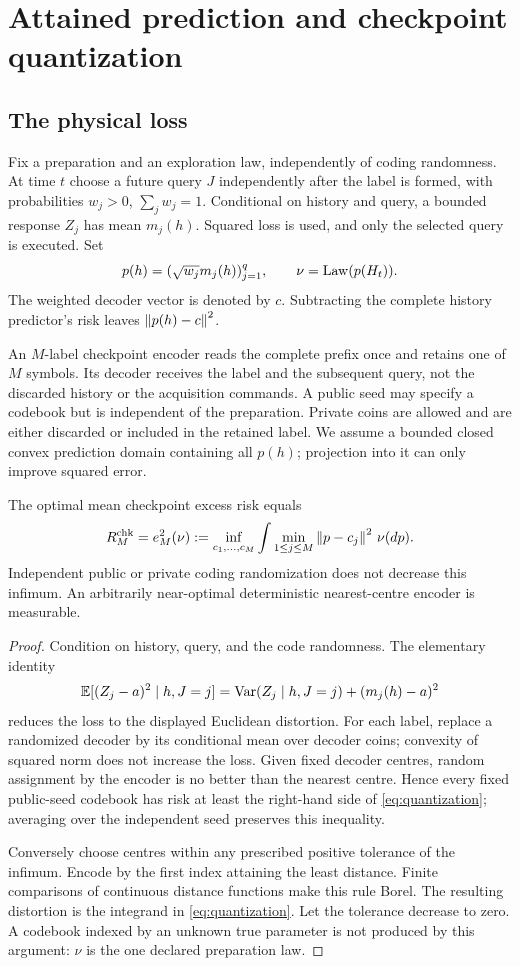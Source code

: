 \section{Attained prediction and checkpoint quantization}\label{sec:checkpoint}
\subsection{The physical loss}
Fix a preparation and an exploration law, independently of coding
randomness. At time $t$ choose a future query $J$ independently after the
label is formed, with probabilities $w_j>0$, $\sum_jw_j=1$. Conditional on
history and query, a bounded response $Z_j$ has mean $m_j(h)$. Squared loss
is used, and only the selected query is executed. Set
\[
 p(h)=(\sqrt{w_j}m_j(h))_{j=1}^q,
 \qquad \nu=\operatorname{Law}(p(H_t)).
\]
The weighted decoder vector is denoted by $c$. Subtracting the complete
history predictor's risk leaves $\left\lVert p(h)-c\right\rVert^2$.

An $M$-label checkpoint encoder reads the complete prefix once and retains
one of $M$ symbols. Its decoder receives the label and the subsequent query,
not the discarded history or the acquisition commands. A public seed may
specify a codebook but is independent of the preparation. Private coins are
allowed and are either discarded or included in the retained label. We
assume a bounded closed convex prediction domain containing all $p(h)$;
projection into it can only improve squared error.

\begin{theorem}\label{thm:quantization}
The optimal mean checkpoint excess risk equals
\begin{equation}\label{eq:quantization}
 R_M^{\rm chk}=e_M^2(\nu):=
 \inf_{c_1,\ldots,c_M}
 \int\min_{1\le j\le M}\left\lVert p-c_j\right\rVert^2\,\nu(dp).
\end{equation}
Independent public or private coding randomization does not decrease this
infimum. An arbitrarily near-optimal deterministic nearest-centre encoder
is measurable.
\end{theorem}
\begin{proof}
Condition on history, query, and the code randomness. The elementary
identity
\[
 \mathbb E[(Z_j-a)^2\mid h,J=j]
 =\operatorname{Var}(Z_j\mid h,J=j)+(m_j(h)-a)^2
\]
reduces the loss to the displayed Euclidean distortion. For each label,
replace a randomized decoder by its conditional mean over decoder coins;
convexity of squared norm does not increase the loss. Given fixed decoder
centres, random assignment by the encoder is no better than the nearest
centre. Hence every fixed public-seed codebook has risk at least the
right-hand side of \eqref{eq:quantization}; averaging over the independent
seed preserves this inequality.

Conversely choose centres within any prescribed positive tolerance of the
infimum. Encode by the first index attaining the least distance. Finite
comparisons of continuous distance functions make this rule Borel. The
resulting distortion is the integrand in \eqref{eq:quantization}. Let the
tolerance decrease to zero. A codebook indexed by an unknown true parameter
is not produced by this argument: $\nu$ is the one declared preparation law.
\end{proof}

